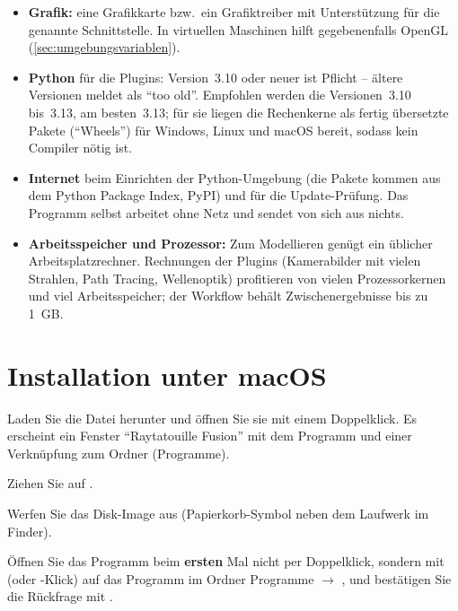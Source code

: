 \begin{itemize}
  \item \textbf{Grafik:} eine Grafikkarte bzw.\ ein Grafiktreiber mit Unterstützung für die
    genannte Schnittstelle. In virtuellen Maschinen hilft gegebenenfalls OpenGL
    (\autoref{sec:umgebungsvariablen}).
  \item \textbf{Python} für die Plugins: Version~3.10 oder neuer ist Pflicht -- ältere
    Versionen meldet  als \enquote{too old}. Empfohlen werden die
    Versionen~3.10 bis~3.13, am besten~3.13; für sie liegen die Rechenkerne als fertig
    übersetzte Pakete (\enquote{Wheels}) für Windows, Linux und macOS bereit, sodass kein
    Compiler nötig ist.
  \item \textbf{Internet} beim Einrichten der Python-Umgebung (die Pakete kommen aus dem
    Python Package Index, PyPI) und für die Update-Prüfung. Das Programm selbst arbeitet
    ohne Netz und sendet von sich aus nichts.
  \item \textbf{Arbeitsspeicher und Prozessor:} Zum Modellieren genügt ein üblicher
    Arbeitsplatzrechner. Rechnungen der Plugins (Kamerabilder mit vielen Strahlen, Path
    Tracing, Wellenoptik) profitieren von vielen Prozessorkernen und viel Arbeitsspeicher;
    der Workflow behält Zwischenergebnisse bis zu \SI{1}{GB}.
\end{itemize}

\section{Installation unter macOS}\label{sec:inst-macos}

\begin{schritte}
  \item Laden Sie die Datei 
    herunter und öffnen Sie sie mit einem Doppelklick. Es erscheint ein Fenster
    \enquote{Raytatouille Fusion} mit dem Programm  und einer
    Verknüpfung zum Ordner  (Programme).
  \item Ziehen Sie  auf .
  \item Werfen Sie das Disk-Image aus (Papierkorb-Symbol neben dem Laufwerk im Finder).
  \item Öffnen Sie das Programm beim \textbf{ersten} Mal nicht per Doppelklick, sondern mit
     (oder -Klick) auf das Programm im Ordner Programme
    $\to$ , und bestätigen Sie die Rückfrage mit .
\end{schritte}

